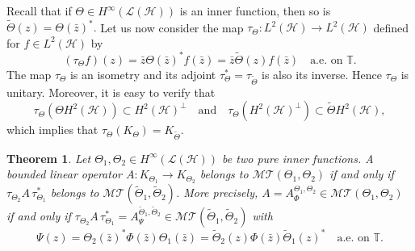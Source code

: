\documentclass[11pt]{amsart}
\numberwithin{equation}{section}
\newcommand{\hsp}{\mathcal{H}}
\newcommand{\oL }{\mathcal{L}(\hsp) }
\newtheorem{theorem}{Theorem}[section]
\theoremstyle{definition}
\numberwithin{equation}{section}
\begin{document}
Recall that if $\Theta\in H^{\infty}(\oL )$ is an inner function, then so is
$\widetilde{\Theta}(z)=\Theta(\bar z)^*.$
Let us now consider the map $\tau_{\Theta}:L^2(\hsp)\to L^2(\hsp)$ defined for $f\in L^2(\hsp)$ by
\begin{equation}
\label{tau}(\tau_{\Theta}f)(z)=\bar z\Theta(\bar z)^*f(\bar z)=\bar z\widetilde{\Theta}( z)f(\bar z)\quad\text{a.e. on }\mathbb{T}.
\end{equation}
The map $\tau_{\Theta}$ is an isometry and its adjoint $\tau_{\Theta}^*=\tau_{\widetilde{\Theta}}$ is also its inverse. Hence $\tau_{\Theta}$ is unitary. Moreover, it is easy to verify that
$$\tau_{\Theta}(\Theta H^2(\hsp))\subset H^2(\hsp)^{\perp}\quad\text{and}\quad \tau_{\Theta}( H^2(\hsp)^{\perp})\subset \widetilde{\Theta} H^2(\hsp),$$
which implies that
$ \tau_{\Theta}(K_{\Theta})=K_{\widetilde{\Theta}}.$
\begin{theorem}\label{ttau}
	Let $\Theta_{1},\Theta_{2}\in H^{\infty}(\oL)$ be two pure inner functions. A bounded linear operator $A:K_{\Theta_1}\to K_{\Theta_2}$ belongs to $\mathcal{MT}(\Theta_{1}, \Theta_{2})$ if and only if $\tau_{\Theta_2}A\,\tau_{\Theta_1}^{*}$ belongs to $\mathcal{MT}(\widetilde{\Theta}_{1}, \widetilde{\Theta}_{2})$. More precisely, $A=A_{\Phi}^{\Theta_{1}, \Theta_{2}}\in \mathcal{MT}(\Theta_{1}, \Theta_{2})$ if and only if $\tau_{\Theta_2}A\,\tau_{\Theta_1}^{*}=A_{\Psi}^{\widetilde{\Theta}_{1}, \widetilde{\Theta}_{2}}\in\mathcal{MT}(\widetilde{\Theta}_{1}, \widetilde{\Theta}_{2})$ with
	\begin{equation}\label{symbda}
	\Psi(z)=\Theta_2(\bar z)^*\Phi(\bar z)\Theta_1(\bar z)=\widetilde{\Theta}_2( z)\Phi(\bar z)\widetilde{\Theta}_1( z)^*\quad\text{a.e. on }\mathbb{T}.
	\end{equation}
\end{theorem}
\end{document}

